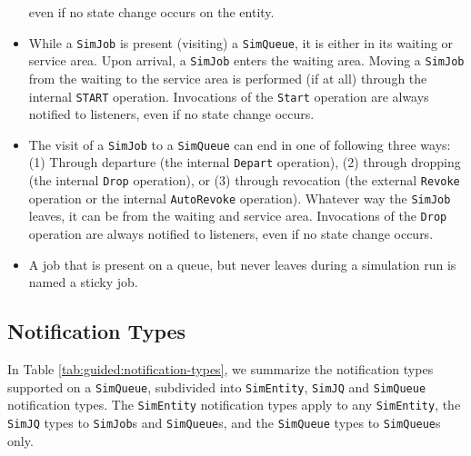\documentclass[12pt]{book}
\begin{document}
\begin{itemize}
          even if no state change occurs on the entity.
  \item While a \lstinline|SimJob| is present (visiting) a \lstinline|SimQueue|,
          it is either in its waiting or service area.
        Upon arrival, a \lstinline|SimJob| enters the waiting area.
        Moving a \lstinline|SimJob| from the waiting to the service area
          is performed (if at all) through the internal \lstinline|START|
          operation.
        Invocations of the \lstinline|Start| operation are always notified to
          listeners, even if no state change occurs.
  \item The visit of a \lstinline|SimJob| to a \lstinline|SimQueue|
          can end in one of following three ways: (1) Through departure
          (the internal \lstinline|Depart| operation), (2) through dropping
          (the internal \lstinline|Drop| operation), or (3) through revocation
          (the external \lstinline|Revoke| operation or the internal \lstinline|AutoRevoke| operation).
        Whatever way the \lstinline|SimJob| leaves, it can be from the waiting
          and service area.
        Invocations of the \lstinline|Drop| operation are always notified to
          listeners, even if no state change occurs.
  \item A job that is present on a queue, but never leaves during a simulation run
          is named a sticky job.
\end{itemize}

\subsection{Notification Types}

In Table \ref{tab:guided:notification-types},
  we summarize the notification types supported on a \lstinline|SimQueue|,
  subdivided into \lstinline|SimEntity|, \lstinline|SimJQ|
  and \lstinline|SimQueue| notification types.
The \lstinline|SimEntity| notification types
  apply to any \lstinline|SimEntity|,
  the \lstinline|SimJQ| types to \lstinline|SimJob|s and \lstinline|SimQueue|s,
  and the \lstinline|SimQueue| types to \lstinline|SimQueue|s only.
\end{document}
